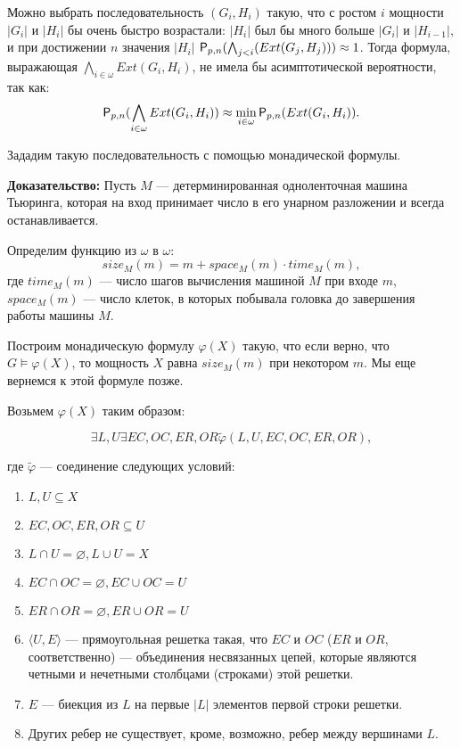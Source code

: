 \documentclass{article}
\begin{document}
Можно выбрать последовательность $(G_i, H_i)$ такую, что с ростом $i$ мощности $|G_i|$ и $|H_i|$ бы очень быстро возрастали: $|H_i|$ был бы много больше $|G_i|$ и $|H_{i-1}|$, и при достижении $n$ значения $|H_i|$ ${\sf P}_{p, n} (\bigwedge_{j < i} (Ext(G_j, H_j))) \approx 1$. Тогда формула, выражающая $\bigwedge_{i \in \omega} Ext(G_i, H_i)$, не имела бы асимптотической вероятности, так как:
$${\sf P}_{p, n}(\bigwedge_{i \in \omega} Ext(G_i, H_i)) \approx \min_{i \in \omega} {\sf P}_{p, n}(Ext(G_i, H_i)).$$

Зададим такую последовательность с помощью монадической формулы.

{\bf Доказательство:} Пусть $M$ --- детерминированная одноленточная машина Тьюринга, которая на вход принимает число в его унарном разложении и всегда останавливается.

Определим функцию из $\omega$ в $\omega$:
$$size_M (m) = m + space_M (m) \cdot time_M (m),$$
где $time_M (m)$ --- число шагов вычисления машиной $M$ при входе $m$, $space_M (m)$ --- число клеток, в которых побывала головка до завершения работы машины $M$.

Построим монадическую формулу $\varphi(X)$ такую, что если верно, что $G \models \varphi(X)$, то мощность $X$ равна $size_M(m)$ при некотором $m$. Мы еще вернемся к этой формуле позже.

Возьмем $\varphi(X)$ таким образом:

$$\exists L, U \exists EC, OC, ER, OR \tilde{\varphi} (L, U, EC, OC, ER, OR),$$

где $\tilde{\varphi}$ --- соединение следующих условий:
\begin{enumerate}
\item $L, U \subseteq X$
\item $EC, OC, ER, OR \subseteq U$
\item $L \cap U = \varnothing, L \cup U = X$
\item $EC \cap OC = \varnothing, EC \cup OC = U$
\item $ER \cap OR = \varnothing, ER \cup OR = U$
\item $\langle U, E \rangle$ --- прямоугольная решетка такая, что $EC$ и $OC$ ($ER$ и $OR$, соответственно) --- объединения несвязанных цепей, которые являются четными и нечетными столбцами (строками) этой решетки.
\item $E$ --- биекция из $L$ на первые $|L|$ элементов первой строки решетки.
\item Других ребер не существует, кроме, возможно, ребер между вершинами $L$.
\end{enumerate}
\end{document}
